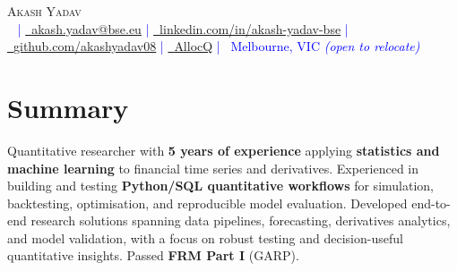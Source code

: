 

\begin{center}
{\Huge \scshape Akash Yadav} \\[3pt]
\footnotesize
\textcolor{blue}{
\raisebox{-0.1\height}\faPhone\ \underline{\href{tel:\phonenum}{\phonenum}} |
\href{mailto:yadav@bse.eu}{\raisebox{-0.2\height}\faEnvelope\  \underline{akash.yadav@bse.eu}} |
\href{https://www.linkedin.com/in/akash-yadav-bse}{\raisebox{-0.2\height}\faLinkedin\ \underline{linkedin.com/in/akash-yadav-bse}} |
\href{https://github.com/akashyadav08}
{\raisebox{-0.2\height}\faGithub\ \underline{github.com/akashyadav08}} |
\href{https://www.allocq.com/}
{\raisebox{-0.1\height}\faAllocQ\ \underline{AllocQ}} |
{\raisebox{-0.1\height}\faMapMarker\ Melbourne, VIC} \textit{(open to relocate)}
}
\end{center}

\section*{Summary}
\noindent
\small
\justifying %
Quantitative researcher with \textbf{5 years of experience} applying \textbf{statistics and machine learning} to financial time series and derivatives. Experienced in building and testing \textbf{Python/SQL quantitative workflows} for simulation, backtesting, optimisation, and reproducible model evaluation. Developed end-to-end research solutions spanning data pipelines, forecasting, derivatives analytics, and model validation, with a focus on robust testing and decision-useful quantitative insights. Passed \textbf{FRM Part I} (GARP).

